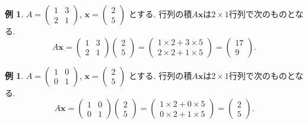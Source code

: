 \documentclass[dvipdfmx,a4paper,11pt]{article}
\theoremstyle{definition}
\newtheorem{exa}[thm]{例}
\begin{document}
  \begin{exa}
 $ A= 
 \begin{pmatrix}
1 & 3\\
2 & 1
 \end{pmatrix}
 $, $
 \bm{x} = 
 \begin{pmatrix}
2 \\5
 \end{pmatrix}
 $
 とする. 
 行列の積$A\bm{x}$は$2 \times 1$行列で次のものとなる.  
 $$
 A\bm{x} = 
 \begin{pmatrix}
1 & 3\\
2 & 1
 \end{pmatrix}
  \begin{pmatrix}
2 \\5
 \end{pmatrix}
 =  
 \begin{pmatrix}
1\times 2 + 3\times 5 \\
2\times 2 + 1 \times 5
 \end{pmatrix}
 = 
  \begin{pmatrix}
17 \\
9
 \end{pmatrix}.
 $$
 
  \end{exa}
   \begin{exa}
 $ A= 
 \begin{pmatrix}
1 & 0\\
0 & 1
 \end{pmatrix}
 $, $
\bm{x}= 
 \begin{pmatrix}
2 \\5
 \end{pmatrix}
 $
 とする. 
 行列の積$A\bm{x}$は$2 \times 1$行列で次のものとなる.  
 $$
 A\bm{x} = 
 \begin{pmatrix}
1 & 0\\
0 & 1
 \end{pmatrix}
  \begin{pmatrix}
2 \\5
 \end{pmatrix}
 =  
 \begin{pmatrix}
1\times 2 + 0\times 5 \\
0\times 2 + 1 \times 5
 \end{pmatrix}
 = 
  \begin{pmatrix}
2 \\5
 \end{pmatrix}.
 $$
 
 \end{exa}
  
\end{document}
